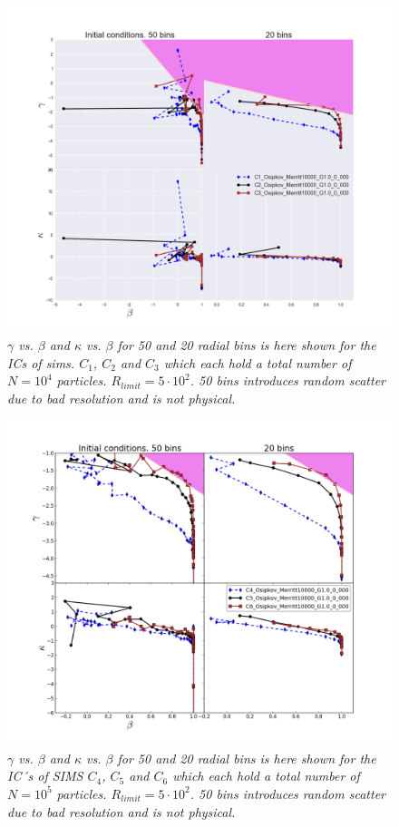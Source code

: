 \begin{figure}[h!]
	\centering
		\includegraphics[width=1.0\linewidth]{img/C1C2C3_beta_gamma_kappa.png}
		{\medskip\caption{\textsl{$\gamma$ vs. $\beta$ and $\kappa$ vs. $\beta$ for 50 and 20 radial bins is here shown for the ICs of sims. $C_1$, $C_2$ and $C_3$ which each hold a total number of $N = 10^4$ particles. $R_{limit} = 5 \cdot 10^2$.
50 bins introduces random scatter due to bad resolution and is not physical.
\label{fig:Rv}}}}
\end{figure} 

\begin{figure}[h!]
	\centering
		\includegraphics[width=1.0\linewidth]{img/C4C5C6_beta_gamma_kappa.png}
		{\medskip\caption{\textsl{$\gamma$ vs. $\beta$ and $\kappa$ vs. $\beta$ for 50 and 20 radial bins is here shown for the IC´s of SIMS $C_4$, $C_5$ and $C_6$ which each hold a total number of $N = 10^5$ particles. $R_{limit} = 5 \cdot 10^2$. 50 bins introduces random scatter due to bad resolution and is not physical.
\label{fig:Rv}}}}
\end{figure} 

